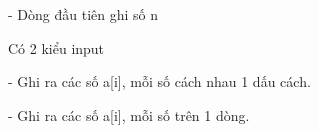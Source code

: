 - Dòng đầu tiên ghi số n

Có 2 kiểu input

- Ghi ra các số a[i], mỗi số cách nhau 1 dấu cách.

- Ghi ra các số a[i], mỗi số trên 1 dòng.

\